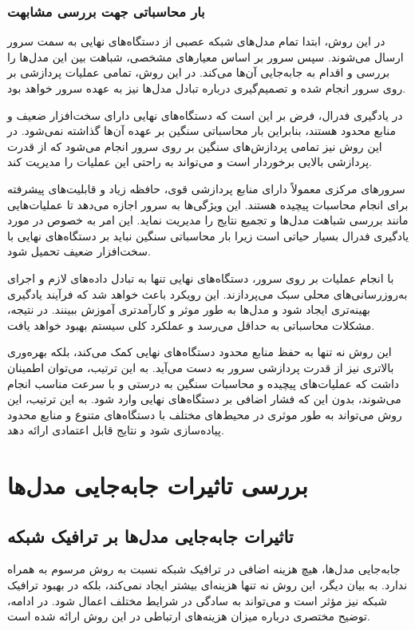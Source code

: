 \vspace{3mm}
\subsubsection{بار محاسباتی جهت بررسی مشابهت}\vspace{-1mm}
در این روش، ابتدا تمام مدل‌های شبکه عصبی از دستگاه‌های نهایی به سمت سرور ارسال می‌شوند. سپس سرور بر اساس معیارهای مشخصی، شباهت بین این مدل‌ها را بررسی و اقدام به جابه‌جایی آن‌ها می‌کند. در این روش، تمامی عملیات پردازشی بر روی سرور انجام شده و تصمیم‌گیری درباره تبادل مدل‌ها نیز به عهده سرور خواهد بود.

در یادگیری فدرال، فرض بر این است که دستگاه‌های نهایی دارای سخت‌افزار ضعیف و منابع محدود هستند، بنابراین بار محاسباتی سنگین بر عهده آن‌ها گذاشته نمی‌شود. در این روش نیز تمامی پردازش‌های سنگین بر روی سرور انجام می‌شود که از قدرت پردازشی بالایی برخوردار است و می‌تواند به راحتی این عملیات را مدیریت کند.

سرورهای مرکزی معمولاً دارای منابع پردازشی قوی، حافظه زیاد و قابلیت‌های پیشرفته برای انجام محاسبات پیچیده هستند. این ویژگی‌ها به سرور اجازه می‌دهد تا عملیات‌هایی مانند بررسی شباهت مدل‌ها و تجمیع نتایج را مدیریت نماید. این امر به خصوص در مورد یادگیری فدرال بسیار حیاتی است زیرا بار محاسباتی سنگین نباید بر دستگاه‌های نهایی با سخت‌افزار ضعیف تحمیل شود.

با انجام عملیات بر روی سرور، دستگاه‌های نهایی تنها به تبادل داده‌های لازم و اجرای به‌روزرسانی‌های محلی سبک می‌پردازند. این رویکرد باعث خواهد شد که فرآیند یادگیری بهینه‌تری ایجاد شود و مدل‌ها به طور موثر و کارآمدتری آموزش ببینند. در نتیجه، مشکلات محاسباتی به حداقل می‌رسد و عملکرد کلی سیستم بهبود خواهد یافت.

این روش نه تنها به حفظ منابع محدود دستگاه‌های نهایی کمک می‌کند، بلکه بهره‌وری بالاتری نیز از قدرت پردازشی سرور به دست می‌آید. به این ترتیب، می‌توان اطمینان داشت که عملیات‌های پیچیده و محاسبات سنگین به درستی و با سرعت مناسب انجام می‌شوند، بدون این که فشار اضافی بر دستگاه‌های نهایی وارد شود. به این ترتیب، این روش می‌تواند به طور موثری در محیط‌های مختلف با دستگاه‌های متنوع و منابع محدود پیاده‌سازی شود و نتایج قابل اعتمادی ارائه دهد.


\section{بررسی تاثیرات جابه‌جایی مدل‌ها}
\subsection{تاثیرات جابه‌جایی مدل‌ها بر ترافیک شبکه}
جابه‌جایی مدل‌ها، هیچ هزینه اضافی در ترافیک شبکه نسبت به روش مرسوم  به همراه ندارد. به بیان دیگر، این روش نه تنها هزینه‌ای بیشتر ایجاد نمی‌کند، بلکه در بهبود ترافیک شبکه نیز مؤثر است و می‌تواند به سادگی در شرایط مختلف اعمال شود. در ادامه، توضیح مختصری درباره میزان هزینه‌های ارتباطی در این روش ارائه شده است.


